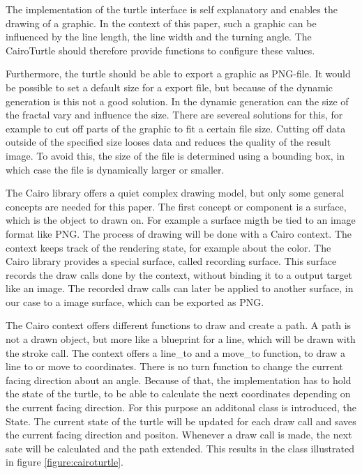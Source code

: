 \documentclass[english]{cpp-hmwk}
\begin{document}
The implementation of the turtle interface is self explanatory and enables the drawing of a graphic. In the context of this paper, such a graphic can be influenced by the line length, the line width and the turning angle. The CairoTurtle should therefore provide functions to configure these values.

Furthermore, the turtle should be able to export a graphic as PNG-file. It would be possible to set a default size for a export file, but because of the dynamic generation is this not a good solution. In the dynamic generation can the size of the fractal vary and influence the size. There are severeal solutions for this, for example to cut off parts of the graphic to fit a certain file size. Cutting off data outside of the specified size looses data and reduces the quality of the result image. To avoid this, the size of the file is determined using a bounding box, in which case the file is dynamically larger or smaller.\newline

\noindent The Cairo library offers a quiet complex drawing model, but only some general concepts are needed for this paper. The first concept or component is a surface, which is the object to drawn on. For example a surface migth be tied to an image format like PNG. The process of drawing will be done with a Cairo context. The context keeps track of the rendering state, for example about the color. The Cairo library provides a special surface, called recording surface. This surface records the draw calls done by the context, without binding it to a output target like an image. The recorded draw calls can later be applied to another surface, in our case to a image surface, which can be exported as PNG.

The Cairo context offers different functions to draw and create a path. A path is not a drawn object, but more like a blueprint for a line, which will be drawn with the stroke call. The context offers a line\_to and a move\_to function, to draw a line to or move to coordinates. There is no turn function to change the current facing direction about an angle. Because of that, the implementation has to hold the state of the turtle, to be able to calculate the next coordinates depending on the current facing direction. For this purpose an additonal class is introduced, the State. The current state of the turtle will be updated for each draw call and saves the current facing direction and positon. Whenever a draw call is made, the next sate will be calculated and the path extended. This results in the class illustrated in figure \ref{figure:cairoturtle}.
\end{document}
